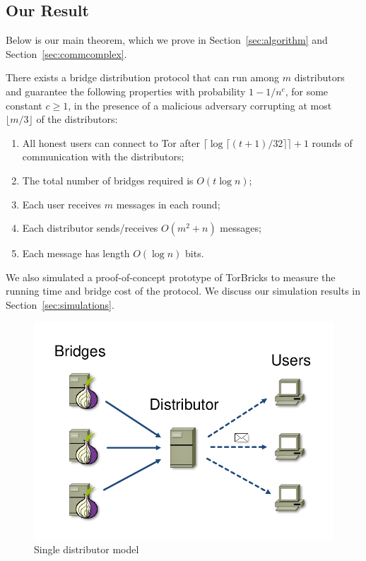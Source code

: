 \documentclass[a4paper,UKenglish]{lipics-v2016}
\newcommand{\todo}[1]{{\leavevmode\color{blue}[TODO: #1]}}
\newcommand{\bricks}{}
\def\bricks/{\mbox{TorBricks}}
\begin{document}
\subsection{Our Result} \label{sec:results}
\noindent Below is our main theorem, which we prove in Section~\ref{sec:algorithm} and Section~\ref{sec:commcomplex}.
\begin{theorem}
	\label{thm:main} There exists a bridge distribution protocol that can run among $m$ distributors and guarantee the following properties with probability ${1 - 1/n^c}$, for some constant ${c \geq 1}$, in the presence of a malicious adversary corrupting at most $\lfloor m/3 \rfloor$ of the distributors: %
	\begin{enumerate}[itemsep=0.4em,topsep=0.5em]
		\item All honest users can connect to Tor after ${\lceil \log{\lceil (t+1)/32 \rceil} \rceil + 1}$ rounds of communication with the distributors;
		\item The total number of bridges required is $O(t\log{n})$;
		\item Each user receives $m$ messages in each round;
		\item Each distributor sends/receives $O(m^2 + n)$ messages;
		\item Each message has length $O(\log{n})$ bits.
	\end{enumerate}
\end{theorem}

We also simulated a proof-of-concept prototype of \bricks/ to measure the running time and bridge cost of the protocol. We discuss our simulation results in Section~\ref{sec:simulations}.

\begin{figure}[t]
	\centering
	\includegraphics[width=0.4\linewidth]{images/single-alg}
	\caption{Single distributor model}
	\label{fig:singledist}
\end{figure}

\end{document}
